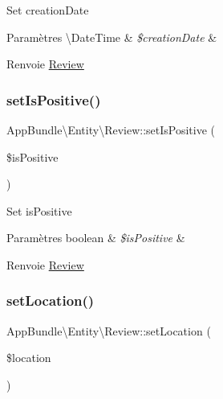 Set creation\+Date


\begin{DoxyParams}[1]{Paramètres}
\textbackslash{}\+Date\+Time & {\em \$creation\+Date} & \\
\hline
\end{DoxyParams}
\begin{DoxyReturn}{Renvoie}
\hyperlink{classAppBundle_1_1Entity_1_1Review}{Review} 
\end{DoxyReturn}
\mbox{\label{classAppBundle_1_1Entity_1_1Review_a80b99fea75d03bb7beb8abf6ed842aac}} 
\subsubsection{\texorpdfstring{set\+Is\+Positive()}{setIsPositive()}}
{\footnotesize\ttfamily App\+Bundle\textbackslash{}\+Entity\textbackslash{}\+Review\+::set\+Is\+Positive (\begin{DoxyParamCaption}\item[{}]{\$is\+Positive }\end{DoxyParamCaption})}

Set is\+Positive


\begin{DoxyParams}[1]{Paramètres}
boolean & {\em \$is\+Positive} & \\
\hline
\end{DoxyParams}
\begin{DoxyReturn}{Renvoie}
\hyperlink{classAppBundle_1_1Entity_1_1Review}{Review} 
\end{DoxyReturn}
\mbox{\label{classAppBundle_1_1Entity_1_1Review_a1f01ea851e2dd32bd7e4fd6d5da2657e}} 
\subsubsection{\texorpdfstring{set\+Location()}{setLocation()}}
{\footnotesize\ttfamily App\+Bundle\textbackslash{}\+Entity\textbackslash{}\+Review\+::set\+Location (\begin{DoxyParamCaption}\item[{\textbackslash{}\hyperlink{classAppBundle_1_1Entity_1_1Location}{App\+Bundle\textbackslash{}\+Entity\textbackslash{}\+Location}}]{\$location }\end{DoxyParamCaption})}

